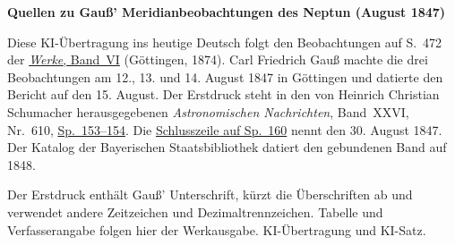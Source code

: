 \clearpage\thispagestyle{empty}
\begin{center}\textbf{Quellen zu Gauß’ Meridianbeobachtungen des Neptun (August 1847)}\end{center}
\noindent Diese KI-Übertragung ins heutige Deutsch folgt den Beobachtungen auf S.~472 der \href{https://gdz.sub.uni-goettingen.de/id/PPN236007467}{\textit{Werke}, Band~VI} (Göttingen, 1874). Carl Friedrich Gauß machte die drei Beobachtungen am 12., 13. und 14. August 1847 in Göttingen und datierte den Bericht auf den 15. August. Der Erstdruck steht in den von Heinrich Christian Schumacher herausgegebenen \textit{Astronomischen Nachrichten}, Band~XXVI, Nr.~610, \href{https://api.digitale-sammlungen.de/iiif/image/v2/bsb10049451_00085/full/1800,/0/default.jpg}{Sp.~153--154}. Die \href{https://api.digitale-sammlungen.de/iiif/image/v2/bsb10049451_00088/full/1800,/0/default.jpg}{Schlusszeile auf Sp.~160} nennt den 30. August 1847. Der Katalog der Bayerischen Staatsbibliothek datiert den gebundenen Band auf 1848.
\par\smallskip\noindent Der Erstdruck enthält Gauß’ Unterschrift, kürzt die Überschriften ab und verwendet andere Zeitzeichen und Dezimaltrennzeichen. Tabelle und Verfasserangabe folgen hier der Werkausgabe. KI-Übertragung und KI-Satz.
\clearpage
